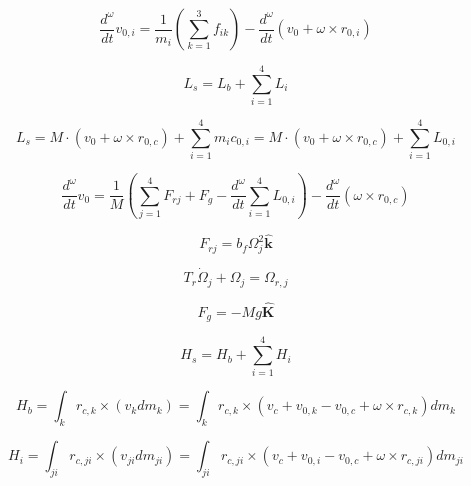 \documentclass[11pt,a4paper]{article}
\begin{document}
\begin{equation}
\frac{d^{\omega}}{dt}v_{0,i} = \frac{1}{m_{i}}\left(\sum_{k=1}^{3}f_{ik}\right) - \frac{d^{\omega}}{dt} \left( v_{0} + \omega \times r_{0,i} \right) 
\label{eq:voidot}
\end{equation}



\begin{equation}
L_{s} = L_{b} + \sum_{i=1}^{4}L_{i}
\label{eq:Ls}
\end{equation}


\begin{equation}
L_{s} = M \cdot (v_{0} + \omega \times r_{0,c}) + \sum_{i=1}^{4}m_{i}c_{0,i} = M \cdot (v_{0} + \omega \times r_{0,c}) + \sum_{i=1}^{4}L_{0,i}
\label{eq:Ls2}
\end{equation}


\begin{equation}
\frac{d^{\omega}}{dt} v_{0} = \frac{1}{M} \left( \sum_{j=1}^{4} F_{rj} + F_{g} - \frac{d^{\omega}}{dt} \sum_{i=1}^{4}L_{0,i}  \right) - \frac{d^{\omega}}{dt} (\omega \times r_{0,c})
\label{eq:v0dot}
\end{equation}


\begin{equation}
F_{rj} = b_{f}\Omega_{j}^{2} \bm{\hat{k}}
\label{eq:Frj}
\end{equation}

\begin{equation}
T_{r}\dot{\Omega}_{j} + \Omega_{j} = \Omega_{r,j}
\label{eq:omega_rj}
\end{equation}

\begin{equation}
F_{g} = -Mg \bm{\hat{K}}
\label{eq:Fg}
\end{equation}

\begin{equation}
H_{s} = H_{b} + \sum_{i=1}^{4}H_{i}
\label{eq:Hs}
\end{equation}

\begin{equation}
H_{b} = \int_{k} r_{c,k} \times (v_{k}dm_{k}) = \int_{k} r_{c,k} \times (v_{c} + v_{0,k} - v_{0,c} + \omega \times r_{c,k})dm_{k}
\label{eq:Hb}
\end{equation}

\begin{equation}
H_{i} = \int_{ji} r_{c,ji} \times (v_{ji}dm_{ji}) = \int_{ji} r_{c,ji} \times (v_{c} + v_{0,i} - v_{0,c} + \omega \times r_{c,ji})dm_{ji}
\label{eq:Hi}
\end{equation}
\end{document}
